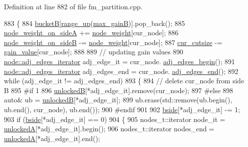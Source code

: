 Definition at line 882 of file fm\+\_\+partition.\+cpp.


\begin{DoxyCode}
883 \{
884     \mbox{\hyperlink{classfm__partition_ae6a5b5f3f2d95ea229882e861ccfc9e4}{bucketB}}[\mbox{\hyperlink{classfm__partition_ac49d477ecbf512fa375b76a472ec54f8}{range\_up}}(\mbox{\hyperlink{classfm__partition_ac230f89828768eaf51374c0bc3b37558}{max\_gainB}})].pop\_back();
885     \mbox{\hyperlink{classfm__partition_a8a50d15b399c9ed35d6987c8fb68aa2b}{node\_weight\_on\_sideA}} += \mbox{\hyperlink{classfm__partition_ae1ba643b4bd6721075ab7b608bcf3cd6}{node\_weight}}[cur\_node];
886     \mbox{\hyperlink{classfm__partition_a6dc967e385b31096a85f17c51f1f0824}{node\_weight\_on\_sideB}} -= \mbox{\hyperlink{classfm__partition_ae1ba643b4bd6721075ab7b608bcf3cd6}{node\_weight}}[cur\_node];
887     \mbox{\hyperlink{classfm__partition_abc8f24c354d2a15f8ec8ef9a46252c93}{cur\_cutsize}} -= \mbox{\hyperlink{classfm__partition_ae8176f4ce82305abfd58e519d2cdd91d}{gain\_value}}[cur\_node];
888     
889     \textcolor{comment}{// updating gain values}
890     \mbox{\hyperlink{classnode_a12cb1a2167f5f03c054de5e707d3156f}{node::adj\_edges\_iterator}} adj\_edge\_it = cur\_node.
      \mbox{\hyperlink{classnode_a788d3e932a5c164caa5ec82aa47551b2}{adj\_edges\_begin}}();
891     \mbox{\hyperlink{classnode_a12cb1a2167f5f03c054de5e707d3156f}{node::adj\_edges\_iterator}} adj\_edges\_end = cur\_node.
      \mbox{\hyperlink{classnode_aa1e7887d29390297580769454f769ad6}{adj\_edges\_end}}();
892     \textcolor{keywordflow}{while} (adj\_edge\_it != adj\_edges\_end)
893     \{
894     \textcolor{comment}{// delete cur\_node from side B}
895 \textcolor{preprocessor}{#if 1}
896         \mbox{\hyperlink{classfm__partition_a74865bf3e6b6f73350c43c3ad9dfda96}{unlockedB}}[*adj\_edge\_it].remove(cur\_node);
897 \textcolor{preprocessor}{#else}
898         \textcolor{keyword}{auto}& ub = \mbox{\hyperlink{classfm__partition_a74865bf3e6b6f73350c43c3ad9dfda96}{unlockedB}}[*adj\_edge\_it];
899         ub.erase(std::remove(ub.begin(), ub.end(), cur\_node), ub.end());
900 \textcolor{preprocessor}{#endif}
901 
902     \mbox{\hyperlink{classfm__partition_aa75765887173fb06b076b6cae12d4e66}{bside}}[*adj\_edge\_it] -= 1;
903     \textcolor{keywordflow}{if} (\mbox{\hyperlink{classfm__partition_aa75765887173fb06b076b6cae12d4e66}{bside}}[*adj\_edge\_it] == 0)
904     \{
905         nodes\_t::iterator node\_it = \mbox{\hyperlink{classfm__partition_a9d75a1d63f711a0c66ae7f5bc181cd8b}{unlockedA}}[*adj\_edge\_it].begin();
906         nodes\_t::iterator nodes\_end = \mbox{\hyperlink{classfm__partition_a9d75a1d63f711a0c66ae7f5bc181cd8b}{unlockedA}}[*adj\_edge\_it].end();

\end{DoxyCode}
